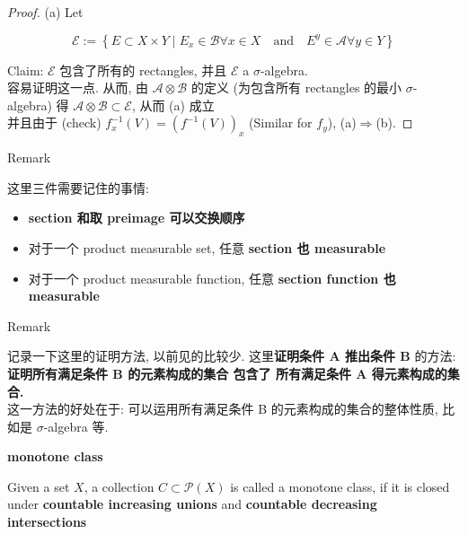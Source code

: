 \documentclass{qlnotes-export}
\begin{document}
\begin{proof}

(a) Let

\[\mathcal{E} := \left\{ {E \subset X \times Y \mid E_{x} \in \mathcal{B}\forall x \in X\quad\text{and}\quad E^{y} \in \mathcal{A}\forall y \in Y} \right\}\]

Claim: \(\mathcal{E}\) 包含了所有的 rectangles, 并且 \(\mathcal{E}\) a \(\sigma\)-algebra.\\
容易证明这一点. 从而, 由 \(\mathcal{A} \otimes \mathcal{B}\) 的定义 (为包含所有 rectangles 的最小 \(\sigma\)-algebra) 得 \(\mathcal{A} \otimes \mathcal{B} \subset \mathcal{E}\), 从而 (a) 成立\\
并且由于 (check) \(f_{x}^{- 1}(V) = (f^{- 1}(V))_{x}\) (Similar for \(f_{y}\)), (a)\(\Longrightarrow\)(b).

\end{proof}

\begin{qlremark}{Remark}

这里三件需要记住的事情:

\begin{itemize}
\item
  \textbf{section 和取 preimage 可以交换顺序}
\item
  对于一个 product measurable set, 任意 \textbf{section 也 measurable}
\item
  对于一个 product measurable function, 任意 \textbf{section function 也 measurable}
\end{itemize}

\end{qlremark}

\begin{qlremark}{Remark}

记录一下这里的证明方法, 以前见的比较少. 这里\textbf{证明条件 A 推出条件 B} 的方法: \textbf{证明所有满足条件 B 的元素构成的集合 包含了 所有满足条件 A 得元素构成的集合.}\\
这一方法的好处在于: 可以运用所有满足条件 B 的元素构成的集合的整体性质, 比如是 \(\sigma\)-algebra 等.

\end{qlremark}

\begin{definition}{\protect{}\label{kn-monotone-class}{\textbf{monotone
class}}}

Given a set \(X\), a collection \(C \subset \mathcal{P}(X)\) is called a monotone class, if it is closed under \textbf{countable increasing unions} and \textbf{countable decreasing intersections}

\end{definition}
\end{document}
